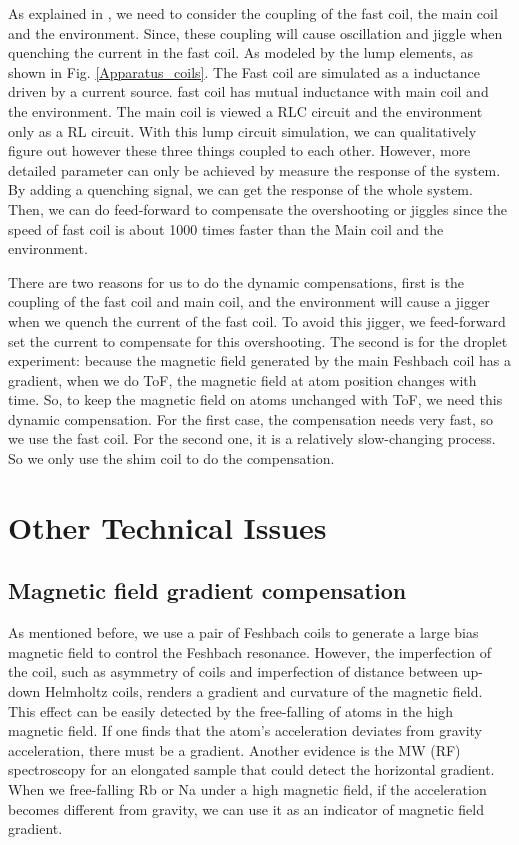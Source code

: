 As explained in \cite{cumby2012exploring}, we need to consider the coupling of the fast coil, the main coil and the environment. Since, these coupling will cause oscillation and jiggle when quenching the current in the fast coil. As modeled by the lump elements, as shown in Fig. \ref{Apparatus_coils}. The Fast coil are simulated as a inductance driven by a current source. fast coil has mutual inductance with main coil and the environment. The main coil is viewed a RLC circuit and the environment only as a RL circuit. With this lump circuit simulation, we can qualitatively figure out however these three things coupled to each other. However, more detailed parameter can only be achieved by measure the response of the system. By adding a quenching signal, we can get the response of the whole system. Then, we can do feed-forward to compensate the overshooting or jiggles since the speed of fast coil is about 1000 times faster than the Main coil and the environment.

There are two reasons for us to do the dynamic compensations, first is the coupling of the fast coil and main coil, and the environment will cause a jigger when we quench the current of the fast coil. To avoid this jigger, we feed-forward set the current to compensate for this overshooting. The second is for the droplet experiment: because the magnetic field generated by the main Feshbach coil has a gradient, when we do ToF, the magnetic field at atom position changes with time. So, to keep the magnetic field on atoms unchanged with ToF, we need this dynamic compensation. For the first case, the compensation needs very fast, so we use the fast coil. For the second one, it is a relatively slow-changing process. So we only use the shim coil to do the compensation. 

\section{Other Technical Issues}
\subsection{Magnetic field gradient compensation}
\label{subsec:gradientcompen}

As mentioned before, we use a pair of Feshbach coils to generate a large bias magnetic field to control the Feshbach resonance. However,  the imperfection of the coil, such as asymmetry of coils and imperfection of distance between up-down Helmholtz coils, renders a gradient and curvature of the magnetic field. This effect can be easily detected by the free-falling of atoms in the high magnetic field. If one finds that the atom's acceleration deviates from gravity acceleration, there must be a gradient. Another evidence is the MW (RF) spectroscopy for an elongated sample that could detect the horizontal gradient. When we free-falling Rb or Na under a high magnetic field, if the acceleration becomes different from gravity, we can use it as an indicator of magnetic field gradient.

